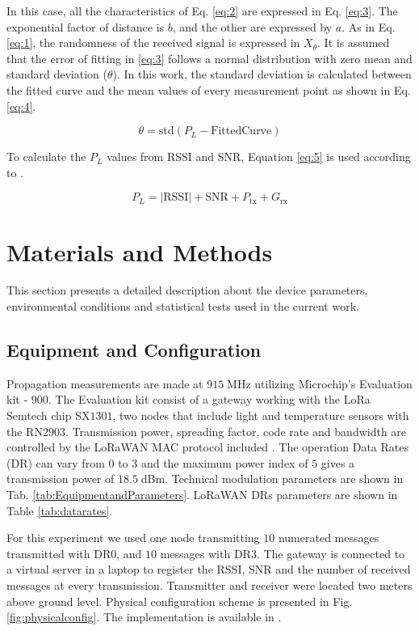 In this case, all the characteristics of Eq. \eqref{eq:2} are expressed in Eq. \eqref{eq:3}. The exponential factor of distance is $b$, and the other are expressed by $a$. As in Eq. \eqref{eq:1}, the randomness of the received signal is expressed in $X_\theta$. It is assumed that the error of fitting in \eqref{eq:3} follows a normal distribution with zero mean and standard deviation ($\theta$). In this work, the standard deviation is calculated between the fitted curve and the mean values of every measurement point as shown in Eq. \eqref{eq:4}.

\begin{equation} \label{eq:4}
\theta = \text{std}(P_L-\text{FittedCurve})
\end{equation}

To calculate the $P_L$ values from RSSI and SNR, Equation \eqref{eq:5} is used according to \cite{Mikhaylov2016}.

\begin{equation} \label{eq:5}
P_L=|\text{RSSI}|+\text{SNR}+P_{\text{tx}}+G_{\text{rx}}
\end{equation}

\section{Materials and Methods}

This section presents a detailed description about the device parameters, environmental conditions and statistical tests used in the current work.

\subsection{Equipment and Configuration}
Propagation measurements are made at $915\;$MHz utilizing Microchip's Evaluation kit - $900$. The Evaluation kit consist of a gateway working with the LoRa Semtech chip SX$1301$, two nodes that include light and temperature sensors with the RN$2903$. Transmission power, spreading factor, code rate and bandwidth are controlled by the LoRaWAN MAC protocol included \cite{N.SorninSemtechM.LuisSemtechT.EirichIBMT.KrampIBM2015}. The operation Data Rates (DR) can vary from $0$ to $3$ and the maximum power index of $5$ gives a transmission power of $18.5\;$dBm. Technical modulation parameters are shown in Tab. \ref{tab:EquipmentandParameters}. LoRaWAN DRs parameters are shown in Table \ref{tab:datarates}. 

For this experiment we used one node transmitting $10$ numerated messages transmitted with DR$0$, and $10$ messages with DR$3$. The gateway is connected to a virtual server in a laptop to register the RSSI, SNR and the number of received messages at every transmission. Transmitter and receiver were located two meters above ground level. Physical configuration scheme is presented in Fig. \ref{fig:physicalconfig}. The implementation is available in \cite{Avila2017}.

